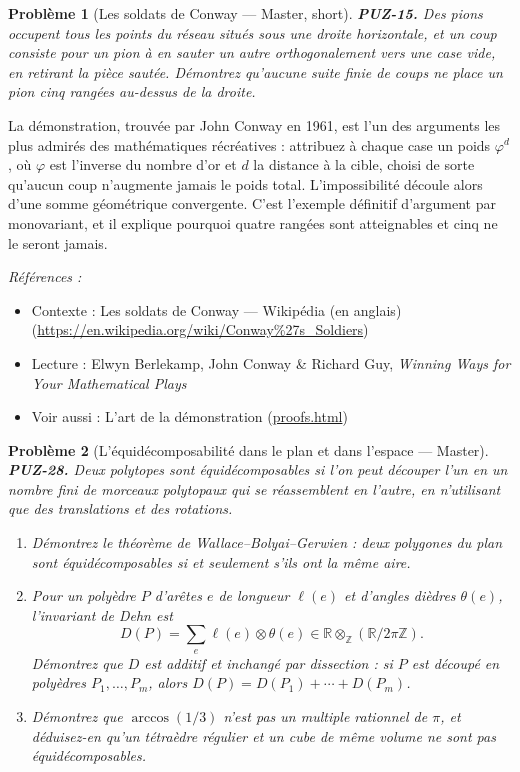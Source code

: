 \documentclass[11pt]{article}
\newtheorem{problem}{Problème}
\newenvironment{refs}{\par\small\noindent\emph{Références :}\begin{itemize}\setlength\itemsep{0pt}}{\end{itemize}\normalsize}
\begin{document}
\bigskip

\begin{problem}[{Les soldats de Conway --- Master, short}]
\textbf{PUZ-15.} Des pions occupent tous les points du réseau situés
sous une droite horizontale, et un coup consiste pour un pion à en sauter un autre
orthogonalement vers une case vide, en retirant la pièce sautée. Démontrez qu'aucune suite
finie de coups ne place un pion cinq rangées au-dessus de la droite.
\end{problem}

\noindent La démonstration, trouvée par John Conway en 1961, est l'un des arguments
les plus admirés des mathématiques récréatives : attribuez à chaque case un poids
$ \varphi^{d} $, où $ \varphi $ est l'inverse du nombre d'or et $ d $ la distance à la
cible, choisi de sorte qu'aucun coup n'augmente jamais le poids total. L'impossibilité
découle alors d'une somme géométrique convergente. C'est l'exemple définitif d'argument par
monovariant, et il explique pourquoi quatre rangées sont atteignables et cinq ne le seront
jamais.

\begin{refs}
\item Contexte : Les soldats de Conway --- Wikipédia (en anglais) (\url{https://en.wikipedia.org/wiki/Conway%27s_Soldiers})
\item Lecture : Elwyn Berlekamp, John Conway \& Richard Guy, \textit{Winning Ways for Your Mathematical Plays}
\item Voir aussi : L'art de la démonstration (\url{proofs.html})
\end{refs}

\bigskip

\begin{problem}[{L'équidécomposabilité dans le plan et dans l'espace --- Master}]
\textbf{PUZ-28.} Deux polytopes sont \textit{équidécomposables} si l'on peut découper l'un en un nombre fini de morceaux polytopaux qui se réassemblent en l'autre, en n'utilisant que des translations et des rotations.
\begin{enumerate}
\item[(a)] Démontrez le théorème de Wallace--Bolyai--Gerwien : deux polygones du plan sont équidécomposables si et seulement s'ils ont la même aire.
\item[(b)] Pour un polyèdre $ P $ d'arêtes $ e $ de longueur $ \ell(e) $ et d'angles dièdres $ \theta(e) $, l'invariant de Dehn est \[ D(P) = \sum_{e} \ell(e) \otimes \theta(e) \in \mathbb{R} \otimes_{\mathbb{Z}} (\mathbb{R}/2\pi\mathbb{Z}). \] Démontrez que $ D $ est additif et inchangé par dissection : si $ P $ est découpé en polyèdres $ P_1, \ldots, P_m $, alors $ D(P) = D(P_1) + \cdots + D(P_m) $.
\item[(c)] Démontrez que $ \arccos(1/3) $ n'est pas un multiple rationnel de $ \pi $, et déduisez-en qu'un tétraèdre régulier et un cube de même volume ne sont pas équidécomposables.
\end{enumerate}

\end{problem}
\end{document}

